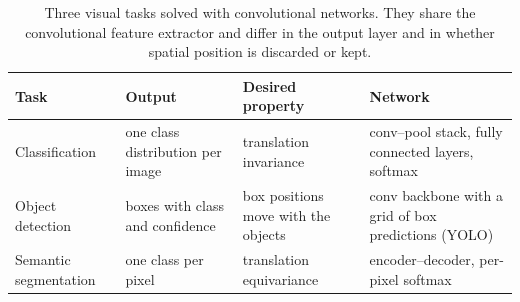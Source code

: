 \begin{table}[ht]
  \centering
  \begin{tabular}{@{}p{2.8cm}p{3.7cm}p{3.4cm}p{3.6cm}@{}}
    \toprule
    Task & Output & Desired property & Network \\
    \midrule
    Classification & one class distribution per image & translation invariance &
      conv--pool stack, fully connected layers, softmax \\
    Object detection & boxes with class and confidence & box positions move with
      the objects & conv backbone with a grid of box predictions (YOLO) \\
    Semantic segmentation & one class per pixel & translation equivariance &
      encoder--decoder, per-pixel softmax \\
    \bottomrule
  \end{tabular}
  \caption{Three visual tasks solved with convolutional networks. They share the
  convolutional feature extractor and differ in the output layer and in whether
  spatial position is discarded or kept.}
  \label{tab:cnn-tasks}
\end{table}
